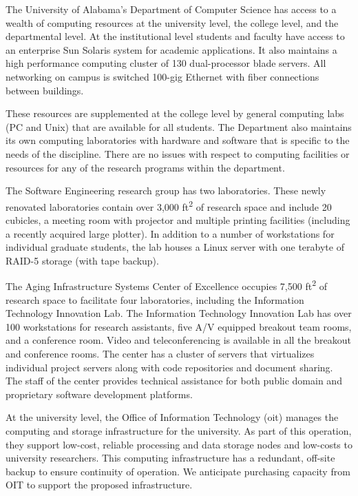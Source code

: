 \label{key}The University of Alabama's Department of Computer Science has access to a wealth of computing resources at the university level, the college level, and the departmental level.  At the institutional level students and faculty have access to an enterprise Sun Solaris system for academic applications.  It also maintains a high performance computing cluster of 130 dual-processor blade servers.  All networking on campus is switched 100-gig Ethernet with fiber connections between buildings.  

These resources are supplemented at the college level by general computing labs (PC and Unix) that are available for all students. The Department also maintains its own computing laboratories with hardware and software that is specific to the needs of the discipline. There are no issues with respect to computing facilities or resources for any of the research programs within the department.

The Software Engineering research group has two laboratories. These newly renovated laboratories contain over 3,000 ft\textsuperscript{2} of research space and include 20 cubicles, a meeting room with projector and multiple printing facilities (including a recently acquired large plotter). In addition to a number of workstations for individual graduate students, the lab houses a Linux server with one terabyte of RAID-5 storage (with tape backup).

The Aging Infrastructure Systems Center of Excellence occupies 7,500 ft\textsuperscript{2} of research space to facilitate four laboratories, including the Information Technology Innovation Lab.  The Information Technology Innovation Lab has over 100 workstations for research assistants, five A/V equipped breakout team rooms, and a conference room.  Video and teleconferencing is available in all the breakout and conference rooms.   The center has a cluster of servers that virtualizes individual project servers along with code repositories and document sharing.  The staff of the center provides technical assistance for both public domain and proprietary software development platforms. 

At the university level, the Office of Information Technology (oit) manages the computing and storage infrastructure for the university. As part of this operation, they support low-cost, reliable processing and data storage nodes and low-costs to university researchers. This computing infrastructure has a redundant, off-site backup to ensure continuity of operation. We anticipate purchasing capacity from OIT to support the proposed infrastructure.
